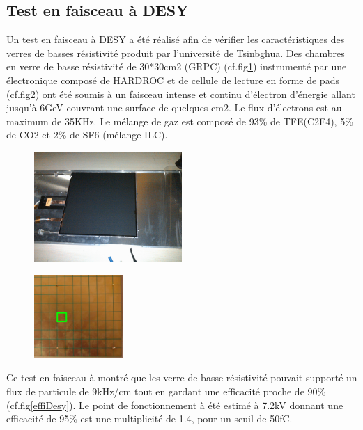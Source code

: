\subsection{Test en faisceau à DESY}
Un test en faisceau à DESY \cite{Haddad:2012fx} a été réalisé afin de vérifier les caractéristiques des verres de basses résistivité produit par l'université de Tsinbghua. Des chambres en verre de basse résistivité de 30*30cm2 (GRPC) (cf.fig\ref{chambre}) instrumenté par une électronique composé de HARDROC et de cellule de lecture en forme de pads (cf.fig\ref{cellule}) ont été soumis à un faisceau intense et continu d'électron d'énergie allant jusqu'à 6GeV couvrant une surface de quelques cm2. Le flux d'électrons est au maximum de 35KHz. Le mélange de gaz est composé de 93\% de TFE(C2F4), 5\% de CO2 et 2\% de SF6 (mélange ILC).
\begin{figure}[ht!]
	\centering
	\includegraphics[width=0.5\textwidth]{GLA/chambre.png}
	\label{chambre}
\end{figure}
\begin{figure}[ht!]
	\centering
	\includegraphics[width=0.3\textwidth]{GLA/cellules.png}
	\label{cellule}
\end{figure}

Ce test en faisceau à montré que les verre de basse résistivité pouvait supporté un flux de particule de 9kHz/cm tout en gardant une efficacité proche de 90\% (cf.fig\ref{effiDesy}). Le point de fonctionnement à été estimé à 7.2kV donnant une efficacité de 95\% est une multiplicité de 1.4, pour un seuil de 50fC. 

